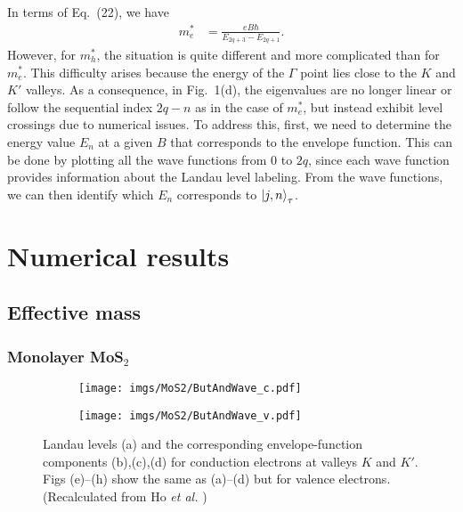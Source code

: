 \documentclass{article}
\begin{document}
In terms of Eq.~(22), we have
\begin{equation}
	\begin{aligned}
		m_{e}^{*} & = \frac{e B \hbar}{E_{2q+3} - E_{2q+1}}.
	\end{aligned}
\end{equation}
However, for $m_{h}^{*}$, the situation is quite different and more complicated than for $m_{e}^{*}$. This difficulty arises because the energy of the $\Gamma$ point lies close to the $K$ and $K'$ valleys. 
As a consequence, in Fig.~1(d), the eigenvalues are no longer linear or follow the sequential index $2q-n$ as in the case of $m_{e}^{*}$, but instead exhibit level crossings due to numerical issues. 
To address this, first, we need to determine the energy value $E_{n}$ at a given $B$ that corresponds to the envelope function. 
This can be done by plotting all the wave functions from $0$ to $2q$, since each wave function provides information about the Landau level labeling. 
From the wave functions, we can then identify which $E_{n}$ corresponds to $\ket{j,n}_{\tau}$.



\newpage
\section{Numerical results}
\subsection{Effective mass}
\subsubsection*{Monolayer MoS$_{2}$}

\begin{figure}[htb]
	\begin{subfigure}{0.495\textwidth}
		\centering
		\texttt{[image: imgs/MoS2/ButAndWave\_c.pdf]}
	\end{subfigure}
	\begin{subfigure}{0.495\textwidth}
		\centering
		\texttt{[image: imgs/MoS2/ButAndWave\_v.pdf]}
	\end{subfigure}
	\caption{Landau levels (a) and the corresponding envelope-function components (b),(c),(d) for conduction electrons at valleys $K$ and $K'$. Figs (e)–(h) show the same as (a)–(d) but for valence electrons. (Recalculated from Ho \textit{et al.} \cite{ho2014})}
\end{figure}
\end{document}
